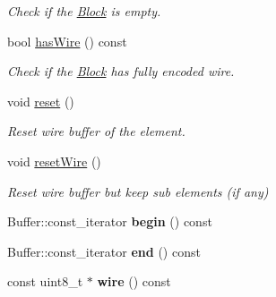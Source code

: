 \begin{DoxyCompactItemize}
\begin{DoxyCompactList}\small\item\em Check if the \hyperlink{classndn_1_1Block}{Block} is empty. \end{DoxyCompactList}\item 
bool \hyperlink{classndn_1_1Block_a122eed3977a6010c923484d4d37defdf}{has\+Wire} () const\hypertarget{classndn_1_1Block_a122eed3977a6010c923484d4d37defdf}{}\label{classndn_1_1Block_a122eed3977a6010c923484d4d37defdf}

\begin{DoxyCompactList}\small\item\em Check if the \hyperlink{classndn_1_1Block}{Block} has fully encoded wire. \end{DoxyCompactList}\item 
void \hyperlink{classndn_1_1Block_ad539aff0e8eff97348b8501b5413d017}{reset} ()\hypertarget{classndn_1_1Block_ad539aff0e8eff97348b8501b5413d017}{}\label{classndn_1_1Block_ad539aff0e8eff97348b8501b5413d017}

\begin{DoxyCompactList}\small\item\em Reset wire buffer of the element. \end{DoxyCompactList}\item 
void \hyperlink{classndn_1_1Block_a2642f44d6e5edebfa446dfaf690a8d7e}{reset\+Wire} ()\hypertarget{classndn_1_1Block_a2642f44d6e5edebfa446dfaf690a8d7e}{}\label{classndn_1_1Block_a2642f44d6e5edebfa446dfaf690a8d7e}

\begin{DoxyCompactList}\small\item\em Reset wire buffer but keep sub elements (if any) \end{DoxyCompactList}\item 
Buffer\+::const\+\_\+iterator {\bfseries begin} () const\hypertarget{classndn_1_1Block_a440a9b59bc4161c89f995b4002059e42}{}\label{classndn_1_1Block_a440a9b59bc4161c89f995b4002059e42}

\item 
Buffer\+::const\+\_\+iterator {\bfseries end} () const\hypertarget{classndn_1_1Block_a52df38d6684c53a8726f4339e7c1bfcb}{}\label{classndn_1_1Block_a52df38d6684c53a8726f4339e7c1bfcb}

\item 
const uint8\+\_\+t $\ast$ {\bfseries wire} () const\hypertarget{classndn_1_1Block_a1e6e928d45ca64739624f25f8a7a48c9}{}\label{classndn_1_1Block_a1e6e928d45ca64739624f25f8a7a48c9}


\end{DoxyCompactItemize}
